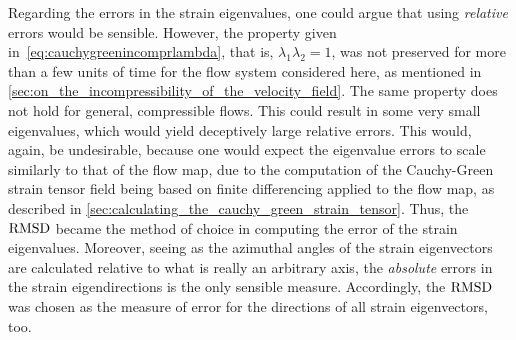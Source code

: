 %
Regarding the errors in the strain eigenvalues, one could argue that using
\emph{relative} errors would be sensible. However, the property
given in~\cref{eq:cauchygreenincomprlambda}, that is,
$\lambda_{1}\lambda_{2}=1$, was not preserved for more than a few units of
time for the flow system considered here, as mentioned in
\cref{sec:on_the_incompressibility_of_the_velocity_field}. The same property
does not hold for general, compressible flows. This could result in
some very small eigenvalues, which would yield deceptively large relative
errors. This would, again, be undesirable, because one would expect the
eigenvalue errors to scale similarly to that of the flow map, due to the
computation of the Cauchy-Green strain tensor field being based on finite
differencing applied to the flow map, as described in
\cref{sec:calculating_the_cauchy_green_strain_tensor}. Thus, the $\operatorname{RMSD}$
became the method of choice in computing the error of the strain eigenvalues.
Moreover, seeing as the azimuthal angles of the strain eigenvectors are
calculated relative to what is really an arbitrary axis, the \emph{absolute}
errors in the strain eigendirections is the only sensible measure. Accordingly,
the $\operatorname{RMSD}$ was chosen as the measure of error for the directions of all strain
eigenvectors, too.
%

